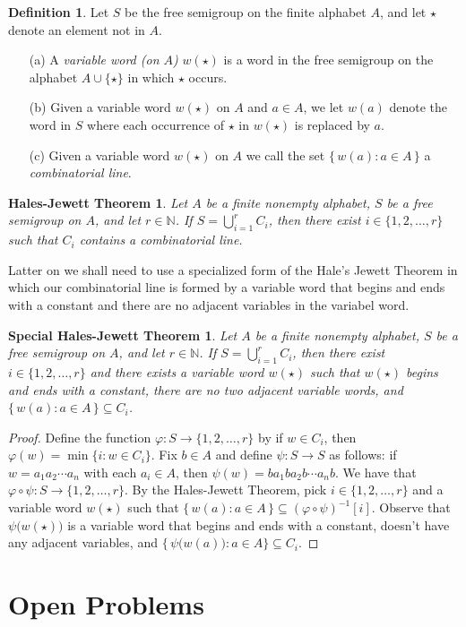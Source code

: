 \documentclass[12pt]{article}
\theoremstyle{plain}
\newtheorem{hj}[thm]{Hales-Jewett Theorem}
\newtheorem{shj}[thm]{Special Hales-Jewett Theorem}
\theoremstyle{definition}
\newtheorem{defn}[thm]{Definition}
\newcommand{\bbN}{\mathbb{N}}
\begin{document}
\begin{defn}
  Let $S$ be the free semigroup on the finite alphabet $A$, and let
  $\star$ denote an element not in $A$.
  \begin{itemize}
    \item[(a)] A \textsl{variable word (on $A$)} $w(\star)$ is a word in the  free semigroup on the alphabet $A \cup \{\star\}$ in which $\star$ occurs.

    \item[(b)] Given a variable word $w(\star)$ on $A$ and $a \in A$, we let $w(a)$ denote the word in $S$ where each occurrence of $\star$ in $w(\star)$ is replaced by $a$.

    \item[(c)] Given a variable word $w(\star)$ on $A$ we call the set $\{\, w(a) : a \in A \,\}$ a \textsl{combinatorial line}.
  \end{itemize}
\end{defn}

\begin{hj}
  Let $A$ be a finite nonempty alphabet, $S$ be a free semigroup on $A$, and let $r \in \bbN$.
  If $S = \bigcup_{i=1}^r C_i$, then there exist $i \in \{1, 2, \ldots, r\}$ such that $C_i$ contains a combinatorial line. 
\end{hj}

Latter on we shall need to use a specialized form of the Hale's Jewett Theorem in which our combinatorial line is formed by a variable word that begins and ends with a constant and there are no adjacent variables in the variabel word.

\begin{shj}
  Let $A$ be a finite nonempty alphabet, $S$ be a free semigroup on $A$, and let $r \in \bbN$.
  If $S = \bigcup_{i=1}^r C_i$, then there exist $i \in \{1, 2, \ldots, r\}$ and there exists a variable word $w(\star)$ such that $w(\star)$ begins and ends with a constant, there are no two adjacent variable words, and $\{\, w(a) : a \in A \,\} \subseteq C_i$.
\end{shj}
\begin{proof}
  Define the function $\varphi \colon S \to \{1, 2, \ldots, r\}$ by if $w \in C_i$, then $\varphi(w) = \min\{i : w \in C_i\}$. 
  Fix $b \in A$ and define $\psi \colon S \to S$ as follows: if $w = a_1a_2 \cdots a_n$ with each $a_i \in A$, then $\psi(w) = ba_1ba_2b\cdots a_nb$.
  We have that $\varphi \circ \psi \colon S \to \{1, 2, \ldots, r\}$.
  By the Hales-Jewett Theorem, pick $i \in \{1, 2, \ldots, r\}$ and a variable word $w(\star)$ such that $\{\, w(a) : a \in A \,\} \subseteq (\varphi \circ \psi)^{-1}[i]$.
  Observe that $\psi\bigl(w(\star)\bigr)$ is a variable word that begins and ends with a constant, doesn't have any adjacent variables, and $\{\, \psi\bigl(w(a)\bigr) : a \in A \} \subseteq C_i$.
\end{proof}


\section*{Open Problems}

\theendnotes



\end{document}
